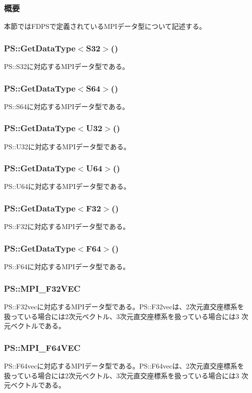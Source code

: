 \subsubsection{概要}

本節ではFDPSで定義されているMPIデータ型について記述する。

\subsubsection{PS::GetDataType$<$S32$>$()}

PS::S32に対応するMPIデータ型である。

\subsubsection{PS::GetDataType$<$S64$>$()}

PS::S64に対応するMPIデータ型である。

\subsubsection{PS::GetDataType$<$U32$>$()}

PS::U32に対応するMPIデータ型である。

\subsubsection{PS::GetDataType$<$U64$>$()}

PS::U64に対応するMPIデータ型である。

\subsubsection{PS::GetDataType$<$F32$>$()}

PS::F32に対応するMPIデータ型である。

\subsubsection{PS::GetDataType$<$F64$>$()}

PS::F64に対応するMPIデータ型である。

\subsubsection{PS::MPI\_F32VEC}

PS::F32vecに対応するMPIデータ型である。PS::F32vecは、2次元直交座標系を
扱っている場合には2次元ベクトル、3次元直交座標系を扱っている場合には3
次元ベクトルである。

\subsubsection{PS::MPI\_F64VEC}

PS::F64vecに対応するMPIデータ型である。PS::F64vecは、2次元直交座標系を
扱っている場合には2次元ベクトル、3次元直交座標系を扱っている場合には3
次元ベクトルである。
